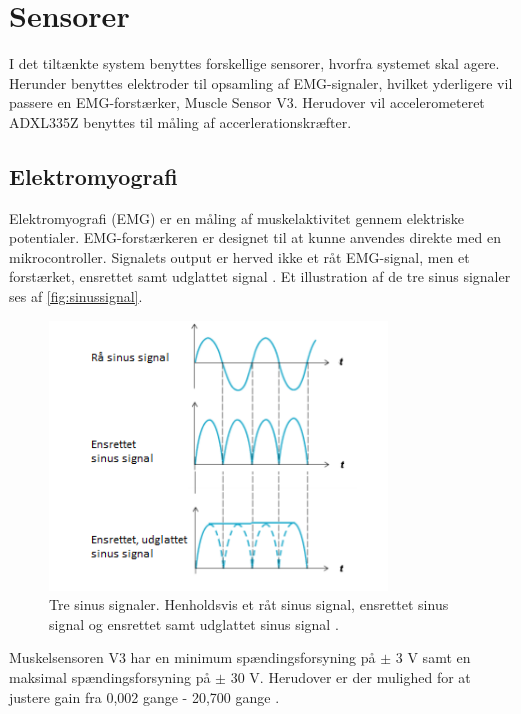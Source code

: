\section{Sensorer} \label{sec:sensorer}
I det tiltænkte system benyttes forskellige sensorer, hvorfra systemet skal agere. Herunder benyttes elektroder til opsamling af EMG-signaler, hvilket yderligere vil passere en EMG-forstærker, Muscle Sensor V3. Herudover vil accelerometeret ADXL335Z benyttes til måling af accerlerationskræfter.

\subsection{Elektromyografi}
Elektromyografi (EMG) er en måling af muskelaktivitet gennem elektriske potentialer. 
EMG-forstærkeren er designet til at kunne anvendes direkte med en mikrocontroller. Signalets output er herved ikke et råt EMG-signal, men et forstærket, ensrettet samt udglattet signal \citep{advancertech2013}. Et illustration af de tre sinus signaler ses af \autoref{fig:sinussignal}.

\begin{figure}[H]
\centering
\includegraphics[width=0.8\textwidth]{figures/sinussignal.png}
\caption{Tre sinus signaler. Henholdsvis et råt sinus signal, ensrettet sinus signal og ensrettet samt udglattet sinus signal \citep{advancertech2013}.}
\label{fig:sinussignal}
\end{figure}

Muskelsensoren V3 har en minimum spændingsforsyning på $\pm$ 3 V samt en maksimal spændingsforsyning på $\pm$ 30 V. Herudover er der mulighed for at justere gain fra 0,002 gange - 20,700 gange \citep{advancertech2013}.

